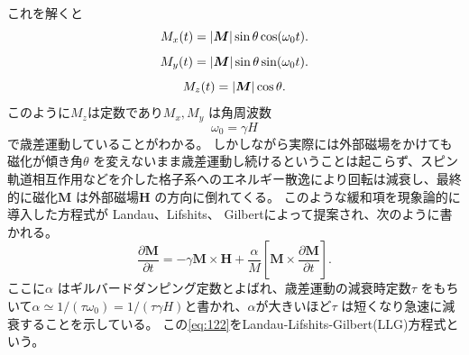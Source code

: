 \documentclass[dvipdfmx]{jsreport}
\numberwithin{equation}{chapter}
\numberwithin{table}{chapter}
\begin{document}
これを解くと
\begin{equation}
\label{eq:119}
	M_x(t)=\abs{\bm{M}}\sin \theta \cos (\omega_0 t)
.\end{equation}
\begin{equation}
\label{eq:119-2}
	M_y(t)=\abs{\bm{M}}\sin \theta \sin  (\omega_0 t)
.\end{equation}
\begin{equation}
\label{eq:120}
	M_z(t)=\abs{\bm{M}}\cos \theta
.\end{equation}
このように$M_z$は定数であり$M_x,M_y$ は角周波数
\begin{equation}
\label{eq:121}
	\omega_0=\gamma H
\end{equation}
で歳差運動していることがわかる。
しかしながら実際には外部磁場をかけても磁化が傾き角$\theta$ を変えないまま歳差運動し続けるということは起こらず、スピン軌道相互作用などを介した格子系へのエネルギー散逸により回転は減衰し、最終的に磁化$\bm{M}$ は外部磁場$\bm{H}$ の方向に倒れてくる。
このような緩和項を現象論的に導入した方程式が Landau、Lifshits、 Gilbertによって提案され、次のように書かれる。
\begin{equation}
\label{eq:122}
	\frac{\partial \bm{M}}{\partial t} =-\gamma \bm{M}\times \bm{H}+\frac{\alpha}{M}\left[ \bm{M}\times \frac{\partial \bm{M}}{\partial t}  \right] 
.\end{equation}
ここに$\alpha$ はギルバードダンピング定数とよばれ、歳差運動の減衰時定数$\tau$ をもちいて$\alpha\simeq 1 /(\tau\omega_0)=1 /(\tau\gamma H)$\cite{alma9926360528104034}と書かれ、$\alpha$が大きいほど$\tau$ は短くなり急速に減衰することを示している。
この\eqref{eq:122}をLandau-Lifshits-Gilbert(LLG)方程式という。
\end{document}
